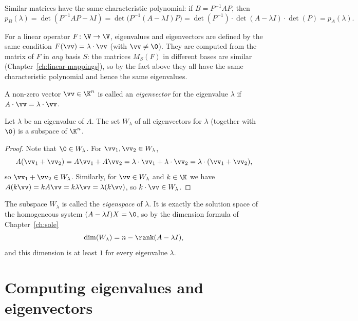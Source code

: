\begin{fact}
Similar matrices have the same characteristic polynomial: if $B = P^{-1}AP$, then
\[
p_B(\lambda) = \det(P^{-1}AP - \lambda I) = \det\big(P^{-1}(A-\lambda I)P\big)
= \det(P^{-1})\cdot\det(A-\lambda I)\cdot\det(P) = p_A(\lambda).
\]
\end{fact}

\begin{remark}
For a linear operator $F\colon\V\to\V$, eigenvalues and eigenvectors are defined by the same condition
$F(\vv) = \lambda\cdot\vv$ (with $\vv\neq\0$). They are computed from the matrix of $F$ in \emph{any}
basis $S$: the matrices $M_S(F)$ in different bases are similar (Chapter~\ref{ch:linear-mappings}), so by
the fact above they all have the same characteristic polynomial and hence the same eigenvalues.
\end{remark}

\begin{definition}
A non-zero vector $\vv\in \K^n$ is called an \emph{eigenvector} for the eigenvalue $\lambda$ if
$A\cdot \vv = \lambda \cdot \vv$.
\end{definition}

\begin{theorem}
Let $\lambda$ be an eigenvalue of $A$. The set $W_\lambda$ of all eigenvectors for $\lambda$ (together with
$\0$) is a subspace of $\K^n$.
\end{theorem}

\begin{proof}
Note that $\0\in W_\lambda$. For $\vv_1,\vv_2\in W_\lambda$,
\[
A(\vv_1+\vv_2)=A\vv_1+A\vv_2=\lambda\cdot \vv_1+\lambda\cdot \vv_2 = \lambda \cdot (\vv_1+\vv_2),
\]
so $\vv_1+\vv_2\in W_\lambda$. Similarly, for $\vv\in W_\lambda$ and $k\in \K$ we have
$A(k\vv)=kA\vv=k\lambda\vv=\lambda(k\vv)$, so $k\cdot \vv\in W_\lambda$.
\end{proof}

\begin{remark}
The subspace $W_\lambda$ is called the \emph{eigenspace} of $\lambda$. It is exactly the solution space of
the homogeneous system $(A-\lambda I)X = \0$, so by the dimension formula of Chapter~\ref{ch:sole}
\[
\dim(W_\lambda) = n - \rank(A-\lambda I),
\]
and this dimension is at least $1$ for every eigenvalue $\lambda$.
\end{remark}

\section{Computing eigenvalues and eigenvectors}

